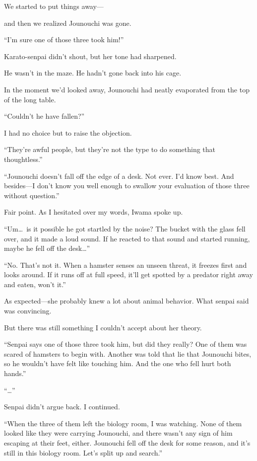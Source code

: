 \documentclass[
    a4paper,
    12pt,
    twoside,
    openany,
    UTF8,
    fontset=windows
]{ctexbook}
\begin{document}
We started to put things away---

and then we realized Jounouchi was gone.

``I'm sure one of those three took him!''

Karato-senpai didn't shout, but her tone had sharpened.

He wasn't in the maze. He hadn't gone back into his cage.

In the moment we'd looked away, Jounouchi had neatly evaporated from the top of the long table.

``Couldn't he have fallen?''

I had no choice but to raise the objection.

``They're awful people, but they're not the type to do something that thoughtless.''

``Jounouchi doesn't fall off the edge of a desk. Not ever. I'd know best. And besides---I don't know you well enough to swallow your evaluation of those three without question.''

Fair point. As I hesitated over my words, Iwama spoke up.

``Um\dots\ is it possible he got startled by the noise? The bucket with the glass fell over, and it made a loud sound. If he reacted to that sound and started running, maybe he fell off the desk\dots''

``No. That's not it. When a hamster senses an unseen threat, it freezes first and looks around. If it runs off at full speed, it'll get spotted by a predator right away and eaten, won't it.''

As expected---she probably knew a lot about animal behavior. What senpai said was convincing.

But there was still something I couldn't accept about her theory.

``Senpai says one of those three took him, but did they really? One of them was scared of hamsters to begin with. Another was told that lie that Jounouchi bites, so he wouldn't have felt like touching him. And the one who fell hurt both hands.''

``\dots''

Senpai didn't argue back. I continued.

``When the three of them left the biology room, I was watching. None of them looked like they were carrying Jounouchi, and there wasn't any sign of him escaping at their feet, either. Jounouchi fell off the desk for some reason, and it's still in this biology room. Let's split up and search.''
\end{document}
